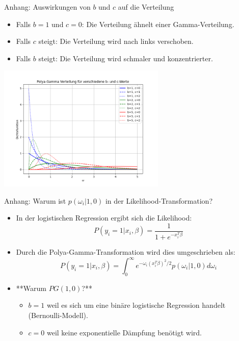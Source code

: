 \documentclass{beamer}
\begin{document}
\begin{frame}{Anhang: Auswirkungen von $b$ und $c$ auf die Verteilung}
	\begin{itemize}
		\item Falls $b = 1$ und $c = 0$: Die Verteilung ähnelt einer Gamma-Verteilung.
		\item Falls $c$ steigt: Die Verteilung wird nach links verschoben.
		\item Falls $b$ steigt: Die Verteilung wird schmaler und konzentrierter.
	\end{itemize}
	\centering
	\includegraphics[width=0.6\textwidth]{polya_gamma_distribution.png}
\end{frame}

\begin{frame}{Anhang: Warum ist $p(\omega_i | 1, 0)$ in der Likelihood-Transformation?}
	\begin{itemize}
		\item In der logistischen Regression ergibt sich die Likelihood:
		\begin{equation}
			P(y_i = 1 | x_i, \beta) = \frac{1}{1 + e^{-x_i^T \beta}}
		\end{equation}
		\item Durch die Polya-Gamma-Transformation wird dies umgeschrieben als:
		\begin{equation}
			P(y_i = 1 | x_i, \beta) = \int_0^\infty e^{-\omega_i (x_i^T \beta)^2 / 2} p(\omega_i | 1, 0) d\omega_i
		\end{equation}
		\item **Warum $PG(1,0)$?**
		\begin{itemize}
			\item $b = 1$ weil es sich um eine binäre logistische Regression handelt (Bernoulli-Modell).
			\item $c = 0$ weil keine exponentielle Dämpfung benötigt wird.
		\end{itemize}
	\end{itemize}
\end{frame}
	
	
\end{document}
